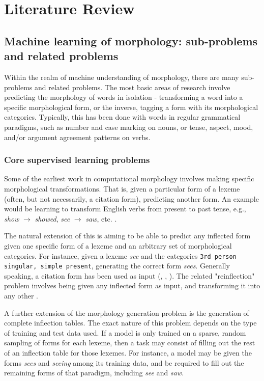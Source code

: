 \chapter{Literature Review}

\section{Machine learning of morphology: sub-problems and related problems}

Within the realm of machine understanding of morphology, there are many sub-problems and related problems. The most basic areas of research involve predicting the morphology of words in isolation - transforming a word into a specific morphological form, or the inverse, tagging a form with its morphological categories. Typically, this has been done with words in regular grammatical paradigms, such as number and case marking on nouns, or tense, aspect, mood, and/or argument agreement patterns on verbs. 

\subsection{Core supervised learning problems}

Some of the earliest work in computational morphology involves making specific morphological transformations. That is, given a particular form of a lexeme (often, but not necessarily, a citation form), predicting another form. An example would be learning to transform English verbs from present to past tense, e.g., \textit{show} $\rightarrow$ \textit{showed}, \textit{see} $\rightarrow$ \textit{saw}, etc. \parencite{Dreyer2008}.

The natural extension of this is aiming to be able to predict any inflected form given one specific form of a lexeme and an arbitrary set of morphological categories. For instance, given a lexeme \textit{see} and the categories \texttt{3rd person singular, simple present}, generating the correct form \textit{sees}. Generally speaking, a citation form has been used as input (\cite{Durrett2013}, \cite{Faruqui2015}, \cite{Cotterell2017a}). The related "reinflection" problem involves being given any inflected form as input, and transforming it into any other \parencite{Cotterell2016}.

A further extension of the morphology generation problem is the generation of complete inflection tables. The exact nature of this problem depends on the type of training and test data used. If a model is only trained on a sparse, random sampling of forms for each lexeme, then a task may consist of filling out the rest of an inflection table for those lexemes. For instance, a model may be given the forms \textit{sees} and \textit{seeing} among its training data, and be required to fill out the remaining forms of that paradigm, including \textit{see} and \textit{saw}. 

